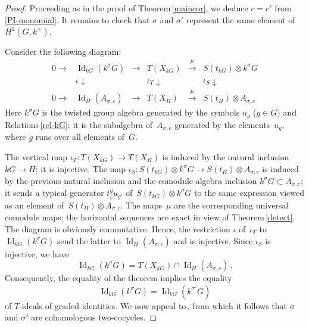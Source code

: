 \documentclass[11pt, a4paper]{amsart}
\theoremstyle{definition}
\numberwithin{equation}{section}
\begin{document}
\begin{proof}
Proceeding as in the proof of Theorem\,\ref{maincor}, we deduce $c=c'$
from\,\eqref{PI-monomial}.
It remains to check that $\sigma$ and $\sigma'$ represent the same element of~$H^2(G,k^{\times})$.

Consider the following diagram: 
\begin{equation*}
\begin{matrix}
0 \to & \operatorname{Id}_{kG}(k^{\sigma}G) & \overset{}{\longrightarrow} & T(X_{kG}) & \overset{\mu}{\longrightarrow} 
& S(t_{kG}) \otimes k^{\sigma}G \\
&\iota\downarrow& &{\iota_T}{\downarrow}& & \iota_S \downarrow \\
0 \to & \operatorname{Id}_{H}(A_{\sigma,c}) & \overset{}{\longrightarrow} & T(X_H) & \overset{\mu}{\longrightarrow} 
& S(t_H) \otimes A_{\sigma,c} 
\end{matrix}
\end{equation*}
Here $k^{\sigma}G$ is the twisted group algebra generated by the symbols $u_g$ ($g\in G$)
and Relations\,\eqref{rel-kG}; it is the subalgebra of~$A_{\sigma,c}$ generated by the elements~$u_g$,
where $g$ runs over all elements of~$G$.

The vertical map $\iota_T: T(X_{kG}) \to T(X_H)$ is induced by the natural inclusion $kG \to H$; it is injective.
The map $\iota_S: S(t_{kG}) \otimes k^{\sigma}G \to S(t_H) \otimes A_{\sigma,c}$ is induced by the previous natural inclusion 
and the comodule algebra inclusion $k^{\sigma}G \subset A_{\sigma,c}$; 
it sends a typical generator $t_i^g u_{g'}$ of~$S(t_{kG}) \otimes k^{\sigma}G$ to the same expression
viewed as an element of~$S(t_H) \otimes A_{\sigma,c}$.
The maps~$\mu$ are the corresponding universal comodule maps; 
the horizontal sequences are exact in view of Theorem\,\ref{detect}.
The diagram is obviously commutative. 
Hence, the restriction $\iota$ of~$\iota_T$ to~$\operatorname{Id}_{kG}(k^{\sigma}G)$ send the latter to $\operatorname{Id}_{H}(A_{\sigma,c})$
and is injective. Since $\iota_S$ is injective, we have
\begin{equation*}
\operatorname{Id}_{kG}(k^{\sigma}G) = T(X_{kG}) \cap \operatorname{Id}_{H}(A_{\sigma,c}) \, .
\end{equation*}
Consequently, the equality of the theorem implies the equality 
\begin{equation*}
\operatorname{Id}_{kG}(k^{\sigma}G) = \operatorname{Id}_{kG}(k^{\sigma'}G)
\end{equation*}
of $T$-ideals of graded identities. 
We now appeal to\,\cite[Sect.\,1]{AHN}, from which it follows
that $\sigma$ and $\sigma'$ are cohomologous two-cocycles. 
\end{proof}
\end{document}
